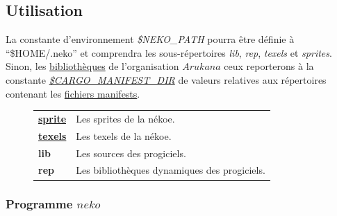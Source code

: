 \documentclass{report}
\newcommand{\organization}{\textit{Arukana}}
\newcommand{\program}{\textit{neko}}
\begin{document}
\subsection{Utilisation}

La constante d’environnement {\textit{\$NEKO\_PATH}} pourra être définie à \enquote{\$HOME/.neko} et comprendra les sous-répertoires {\textit{lib}}, {\textit{rep}}, {\textit{texels}} et {\textit{sprites}}. Sinon, les \href{https://fr.wikipedia.org/wiki/Biblioth%C3%A8que_logicielle}{bibliothèques} de l'organisation $\organization$ ceux reporterons à la constante \href{http://doc.crates.io/environment-variables.html}{\textit{\$CARGO\_MANIFEST\_DIR}} de valeurs relatives aux répertoires contenant les \href{https://en.wikipedia.org/wiki/Manifest_file}{fichiers manifests}.

\begin{figure}[!ht]
    \begin{minipage}{\textwidth}
    \centering
        \begin{tabular}{p{}p{}}
			\href{https://github.com/Arukana/Editor/tree/master/assets/sprites}{\textbf{sprite}} & Les sprites de la nékoe. \\
			\href{https://github.com/Arukana/Editor/tree/master/assets/texels}{\textbf{texels}} & Les texels de la nékoe. \\
			\textbf{lib} & Les sources des progiciels. \\
			\textbf{rep} & Les bibliothèques dynamiques des progiciels.
        \end{tabular}
    \end{minipage}
\end{figure}

\newpage
\subsubsection{Programme $\program$ \textendash{}}
\end{document}
